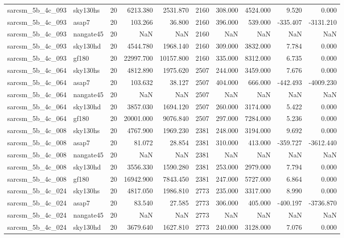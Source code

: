 \begin{tabular}{llrrrrrrrr}
sarcsm\_5b\_4c\_093 & sky130hs & 20 & 6213.380 & 2531.870 & 2160 & 308.000 & 4524.000 & 9.520 & 0.000 \\
sarcsm\_5b\_4c\_093 & asap7 & 20 & 103.266 & 36.800 & 2160 & 396.000 & 539.000 & -335.407 & -3131.210 \\
sarcsm\_5b\_4c\_093 & nangate45 & 20 & NaN & NaN & 2160 & NaN & NaN & NaN & NaN \\
sarcsm\_5b\_4c\_093 & sky130hd & 20 & 4544.780 & 1968.140 & 2160 & 309.000 & 3832.000 & 7.784 & 0.000 \\
sarcsm\_5b\_4c\_093 & gf180 & 20 & 22997.700 & 10157.800 & 2160 & 335.000 & 8312.000 & 6.735 & 0.000 \\
sarcsm\_5b\_4c\_064 & sky130hs & 20 & 4812.890 & 1975.620 & 2507 & 244.000 & 3459.000 & 7.676 & 0.000 \\
sarcsm\_5b\_4c\_064 & asap7 & 20 & 103.632 & 38.127 & 2507 & 404.000 & 666.000 & -442.493 & -4009.230 \\
sarcsm\_5b\_4c\_064 & nangate45 & 20 & NaN & NaN & 2507 & NaN & NaN & NaN & NaN \\
sarcsm\_5b\_4c\_064 & sky130hd & 20 & 3857.030 & 1694.120 & 2507 & 260.000 & 3174.000 & 5.422 & 0.000 \\
sarcsm\_5b\_4c\_064 & gf180 & 20 & 20001.000 & 9076.840 & 2507 & 297.000 & 7284.000 & 5.236 & 0.000 \\
sarcsm\_5b\_4c\_008 & sky130hs & 20 & 4767.900 & 1969.230 & 2381 & 248.000 & 3194.000 & 9.692 & 0.000 \\
sarcsm\_5b\_4c\_008 & asap7 & 20 & 81.072 & 28.854 & 2381 & 310.000 & 413.000 & -359.727 & -3612.440 \\
sarcsm\_5b\_4c\_008 & nangate45 & 20 & NaN & NaN & 2381 & NaN & NaN & NaN & NaN \\
sarcsm\_5b\_4c\_008 & sky130hd & 20 & 3556.330 & 1590.280 & 2381 & 253.000 & 2979.000 & 7.794 & 0.000 \\
sarcsm\_5b\_4c\_008 & gf180 & 20 & 16942.900 & 7843.450 & 2381 & 247.000 & 5727.000 & 6.864 & 0.000 \\
sarcsm\_5b\_4c\_024 & sky130hs & 20 & 4817.050 & 1986.810 & 2773 & 235.000 & 3317.000 & 8.990 & 0.000 \\
sarcsm\_5b\_4c\_024 & asap7 & 20 & 83.540 & 27.585 & 2773 & 306.000 & 405.000 & -400.197 & -3736.870 \\
sarcsm\_5b\_4c\_024 & nangate45 & 20 & NaN & NaN & 2773 & NaN & NaN & NaN & NaN \\
sarcsm\_5b\_4c\_024 & sky130hd & 20 & 3679.640 & 1627.810 & 2773 & 240.000 & 3128.000 & 7.076 & 0.000 \\

\end{tabular}
